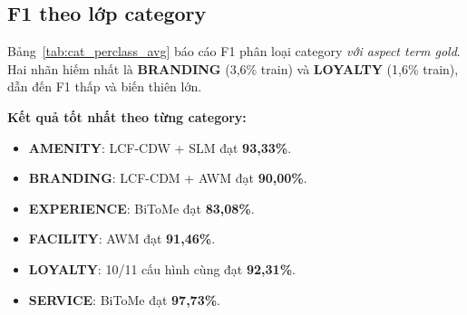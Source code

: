 \subsection{F1 theo lớp category}
\label{subsec:cat_perclass_avg}

Bảng~\ref{tab:cat_perclass_avg} báo cáo F1 phân loại category
\emph{với aspect term gold}. Hai nhãn hiếm nhất là
\textbf{BRANDING} (3,6\% train) và \textbf{LOYALTY} (1,6\% train),
dẫn đến F1 thấp và biến thiên lớn.

\textbf{Kết quả tốt nhất theo từng category:}
\begin{itemize}
  \item \textbf{AMENITY}: LCF-CDW + SLM đạt \textbf{93,33\%}.
  \item \textbf{BRANDING}: LCF-CDM + AWM đạt \textbf{90,00\%}.
  \item \textbf{EXPERIENCE}: BiToMe đạt \textbf{83,08\%}.
  \item \textbf{FACILITY}: AWM đạt \textbf{91,46\%}.
  \item \textbf{LOYALTY}: 10/11 cấu hình cùng đạt \textbf{92,31\%}.
  \item \textbf{SERVICE}: BiToMe đạt \textbf{97,73\%}.
\end{itemize}

